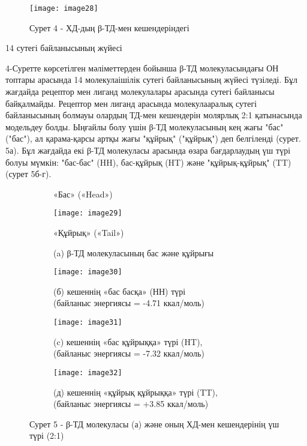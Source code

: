\begin{figure}[H]
\centering
\texttt{[image: image28]}
\caption*{Сурет 4 - ХД-дың β-ТД-мен кешендеріндегі}
\end{figure}

\begin{multicols}{2}
14 сутегі байланысының жүйесі

4-Суретте көрсетілген мәліметтерден бойынша β-ТД молекуласындағы ОН
топтары арасында 14 молекулаішілік сутегі байланысының жүйесі түзіледі.
Бұл жағдайда рецептор мен лиганд молекулалары арасында сутегі байланысы
байқалмайды. Рецептор мен лиганд арасында молекулааралық сутегі
байланысының болмауы олардың ТД-мен кешендерін молярлық 2:1 қатынасында
модельдеу болды. Ыңғайлы болу үшін β-ТД молекуласының кең жағы "бас"
("бас"), ал қарама-қарсы артқы жағы "құйрық" ("құйрық") деп белгіленді
(сурет. 5а). Бұл жағдайда екі β-ТД молекуласы арасында өзара
бағдарлаудың үш түрі болуы мүмкін: "бас-бас" (HH), бас-құйрық (HT) және
"құйрық-құйрық" (TT) (сурет 5б-г).
\end{multicols}

\begin{figure}[H]
\centering
\begin{subfigure}[b]{0.4\textwidth}
\centering
\caption*{«Бас» («Head»)}
\texttt{[image: image29]}
\caption*{«Құйрық» («Tail»)}
\caption*{(a) β-ТД молекуласының бас және құйрығы}
\end{subfigure}
\begin{subfigure}[b]{0.4\textwidth}
\centering
\texttt{[image: image30]}
\caption*{(б) кешеннің «бас басқа» (НН) түрі \\
(байланыс энергиясы = -4.71 ккал/моль)}
\end{subfigure}
\begin{subfigure}[b]{0.4\textwidth}
\centering
\texttt{[image: image31]}
\caption*{(c) кешеннің «бас құйрыққа» түрі (HT), \\
(байланыс энергиясы = -7.32 ккал/моль)}
\end{subfigure}
\begin{subfigure}[b]{0.4\textwidth}
\centering
\texttt{[image: image32]}
\caption*{(д) кешеннің «құйрық құйрыққа» түрі (TT), \\
(байланыс энергиясы = +3.85 ккал/моль)}
\end{subfigure}
\caption*{Сурет 5 - β-ТД молекуласы (а) және оның ХД-мен кешендерінің үш түрі (2:1)}
\end{figure}

